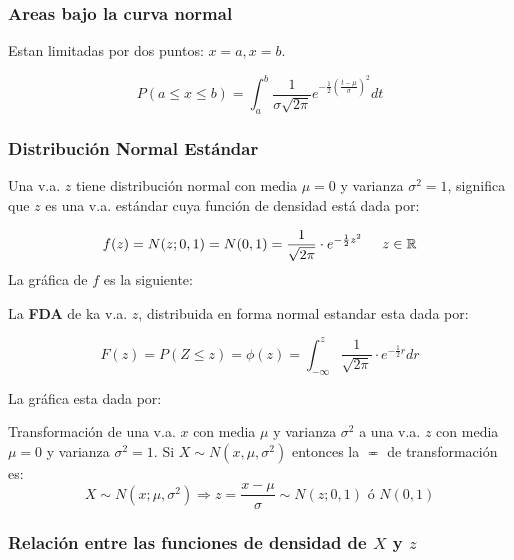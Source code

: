 \subsubsection{Areas bajo la curva normal}
Estan limitadas por dos puntos: $x=a,x=b$.


$$
P(a\leq x \leq b) = \displaystyle\int_{a}^{b} \dfrac{1}{\sigma \sqrt{2\pi}} e^{-\frac{1}{2} (\frac{t-\mu}{\sigma})^2 } dt
$$

\subsubsection{Distribución Normal Estándar}
Una v.a. $z$ tiene distribución normal con media $\mu=0$ y varianza $\sigma^2 = 1$, significa que $z$ es una v.a. estándar cuya función de densidad está dada por:

$$
f(z)=N(z;0,1)=N(0,1)=\dfrac{1}{\sqrt{2\pi}}\cdot e^{-\frac{1}{2}z^2} \hspace{0.5cm} z\in\mathbb{R}
$$
La gráfica de $f$ es la siguiente:


La \textbf{FDA} de ka v.a. $z$, distribuida en forma normal estandar esta dada por:

$$
F(z)=P(Z\leq z)=\phi (z)=\displaystyle\int_{-\infty}^{z} \dfrac{1}{\sqrt{2\pi}}\cdot e^{-\frac{1}{2}r} dr
$$

La gráfica esta dada por:


Transformación de una v.a. $x$ con media $\mu$ y varianza $\sigma^2$ a una v.a. $z$ con media $\mu=0$ y varianza $\sigma^2=1$. Si $X\sim N(x,\mu,\sigma^2)$ entonces la $\eqcirc$ de transformación es:
$$X\sim N(x;\mu,\sigma^2) \Rightarrow z = \dfrac{x-\mu}{\sigma} \sim N(z;0,1) \text{ ó } N(0,1)$$

\subsubsection{Relación entre las funciones de densidad de $X$ y $z$}


